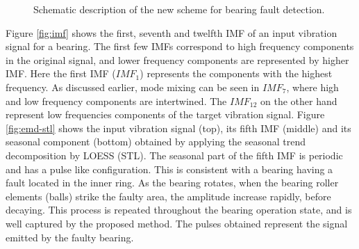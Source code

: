 \documentclass[../Main/thesis.tex]{subfiles}
\begin{document}
\begin{figure}[H]
  \caption{Schematic description of the new scheme for bearing fault detection.}
   \label{fig:pulse}
\end{figure}
\justify
Figure \ref{fig:imf} shows the first, seventh and twelfth IMF of an input vibration signal for a bearing. The first few IMFs correspond to high frequency components in the original signal, and lower frequency components are represented by higher IMF. Here the first IMF ($IMF_{1}$) represents the components with the highest frequency. As discussed earlier, mode mixing can be seen in $IMF_{7}$, where high and low frequency components are intertwined. The $IMF_{12}$ on the other hand represent low frequencies components of the target vibration signal.
Figure \ref{fig:emd-stl} shows  the input vibration signal (top), its fifth IMF (middle) and its seasonal component (bottom) obtained by applying the seasonal trend decomposition by LOESS (STL).   
\justify
The seasonal part of the fifth IMF is periodic and has a pulse like configuration. This is consistent with a bearing having a fault located in the inner ring. As the bearing rotates, when the bearing roller elements (balls) strike the faulty area, the amplitude increase rapidly, before decaying. This process is repeated throughout the bearing operation state, and is well captured by the proposed method. The pulses obtained represent the signal emitted by the faulty bearing.
\end{document}
